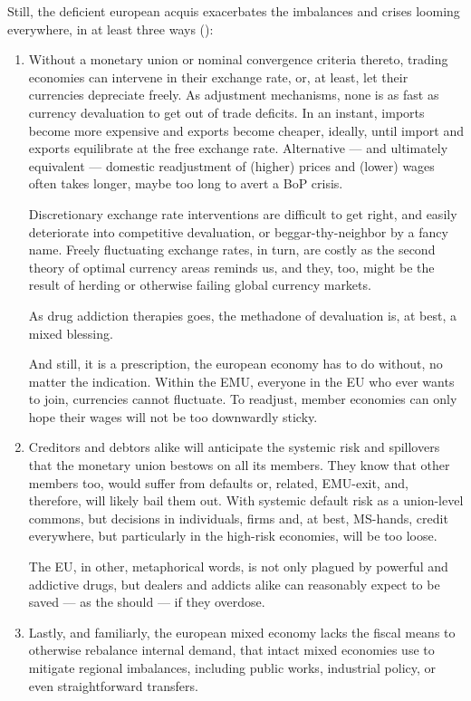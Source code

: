 Still, the deficient european acquis exacerbates the imbalances and crises looming everywhere, in at least three ways (\citep[echoed by][25]{Bordo2011}):
\begin{enumerate}
	\item Without a monetary union or nominal convergence criteria thereto, trading economies can intervene in their exchange rate, or, at least, let their currencies depreciate freely.
As adjustment mechanisms, none is as fast as currency devaluation to get out of trade deficits.
In an instant, imports become more expensive and exports become cheaper, ideally, until import and exports equilibrate at the free exchange rate.
Alternative --- and ultimately equivalent --- domestic readjustment of (higher) prices and (lower) wages often takes longer, maybe too long to avert a \gls{BoP} crisis.

	Discretionary exchange rate interventions are difficult to get right, and easily deteriorate into competitive devaluation, or beggar-thy-neighbor by a fancy name.
	Freely fluctuating exchange rates, in turn, are costly as the second theory of optimal currency areas reminds us, %
	and they, too, might be the result of herding or otherwise failing global currency markets.

	As drug addiction therapies goes, the methadone of devaluation is, at best, a mixed blessing.

	And still, it is a prescription, the european economy has to do without, no matter the indication.
Within the \gls{EMU}, everyone in the \gls{EU} who ever wants to join, currencies cannot fluctuate.
To readjust, member economies can only hope their wages will not be too downwardly sticky.

	\item Creditors and debtors alike will anticipate the systemic risk and spillovers that the monetary union bestows on all its members.
They know that other members too, would suffer from defaults or, related, \gls{EMU}-exit, and, therefore, will likely bail them out.
	With systemic default risk as a union-level commons, but decisions in individuals, firms and, at best, \gls{MS}-hands, credit everywhere, but particularly in the high-risk economies, will be too loose.

	The \gls{EU}, in other, metaphorical words, is not only plagued by powerful and addictive drugs, but dealers and addicts alike can reasonably expect to be saved --- as the should --- if they overdose.

	\item Lastly, and familiarly, the european mixed economy lacks the fiscal means to otherwise rebalance internal demand, that intact mixed economies use to mitigate regional imbalances, including public works, industrial policy, or even straightforward transfers.
\end{enumerate}

